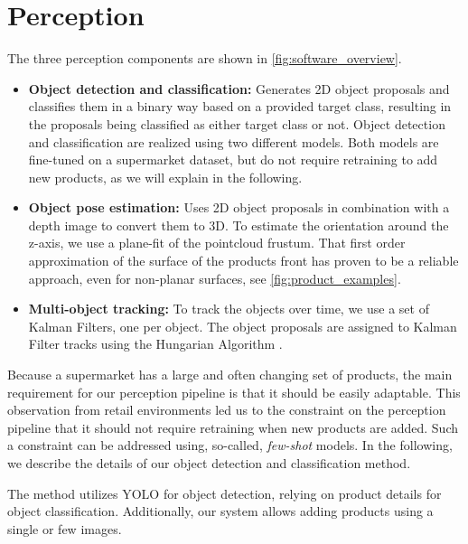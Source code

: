 \section{Perception}
\label{sec:perception}

The three perception components are
shown in \cref{fig:software_overview}.
\begin{itemize}
    \item \textbf{Object detection and classification:}
      Generates 2D object proposals and classifies them in a
      binary way based on a provided target class, resulting
      in the proposals being classified as either target
      class or not. 
      Object detection and classification are realized using
      two different models. Both models are fine-tuned on a 
      supermarket dataset, but do not require retraining to
      add new products, as we will explain in the following.
    \item \textbf{Object pose estimation:} Uses 2D object
      proposals in combination with a depth image to convert
      them to 3D. To estimate the orientation around the
      z-axis, we use a plane-fit of the pointcloud frustum.
      That first order approximation of the surface of the
      products front has proven to be a reliable approach,
      even for non-planar surfaces, see
      \cref{fig:product_examples}.
    \item \textbf{Multi-object tracking:} To track the
      objects over time, we use a set of Kalman Filters, one
      per object. The object proposals are assigned to
      Kalman Filter tracks using the Hungarian Algorithm
      \cite{hamuda2018improved,sahbani2016kalman}.
\end{itemize}

Because a supermarket has a large and often changing set of
products, the main requirement for our perception pipeline
is that it should be easily adaptable. This observation from
retail environments led us to the constraint on the
perception pipeline that it should not require retraining
when new products are added. Such a constraint can be
addressed using, so-called, \textit{few-shot} models.
In the
following, we describe the details of our object detection
and classification method.

The method utilizes YOLO for object detection, relying on
product details for object classification. Additionally, our
system allows adding products using a
single or few images.

